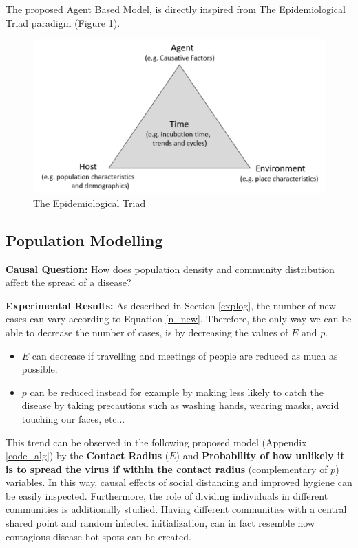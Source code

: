 The proposed Agent Based Model, is directly inspired from The Epidemiological Triad paradigm (Figure \ref{triad}).

\begin{figure}[h]
\vspace{-0.2cm}
\centering
\includegraphics[scale = 0.5]{latex/images/model.pdf}
\caption{The Epidemiological Triad}
\label{triad}
\end{figure}

\subsection{Population Modelling}

\textbf{Causal Question:} How does population density and community distribution affect the spread of a disease?

\textbf{Experimental Results:} As described in Section \ref{explog}, the number of new cases can vary according to Equation \ref{n_new}. Therefore, the only way we can be able to decrease the number of cases, is by decreasing the values of $E$ and $p$. 
\begin{itemize}
    \setlength\itemsep{-0.3cm}
    \item $E$ can decrease if travelling and meetings of people are reduced as much as possible.
    \item $p$ can be reduced instead for example by making less likely to catch the disease by taking precautions such as washing hands, wearing masks, avoid touching our faces, etc...
\end{itemize}

This trend can be observed in the following proposed model (Appendix \ref{code_alg}) by the \textbf{Contact Radius} ($E$) and \textbf{Probability of how unlikely it is to spread the virus if within the contact radius} (complementary of $p$) variables.
In this way, causal effects of social distancing and improved hygiene can be easily inspected. Furthermore, the role of dividing individuals in different communities is additionally studied. Having different communities with a central shared point and random infected initialization, can in fact resemble how contagious disease hot-spots can be created.

